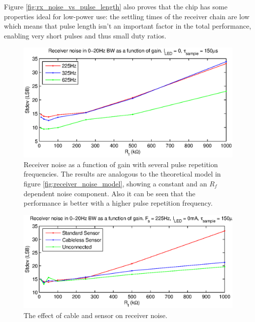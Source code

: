 Figure \ref{fig:rx_noise_vs_pulse_length} also proves that the chip has some properties ideal for low-power use: the settling times of the receiver chain are low which means that pulse length isn't an important factor in the total performance, enabling very short pulses and thus small duty ratios.

\begin{figure}[htcb]
\begin{center}
\includegraphics{kuvat/measurements/rx_noise_vs_gain.eps}
\caption{Receiver noise as a function of gain with several pulse repetition frequencies. The results are analogous to the theoretical model in figure \ref{fig:receiver_noise_model}, showing a constant and an $R_f$ dependent noise component. Also it can be seen that the performance is better with a higher pulse repetition frequency.}
\label{fig:rx_noise_vs_gain}
\end{center}
\end{figure}

\begin{figure}[htcb]
\begin{center}
\includegraphics[scale=1]{kuvat/measurements/cable_effect.eps}
\caption{The effect of cable and sensor on receiver noise.}
\label{fig:cable_effect}
\end{center}
\end{figure}

